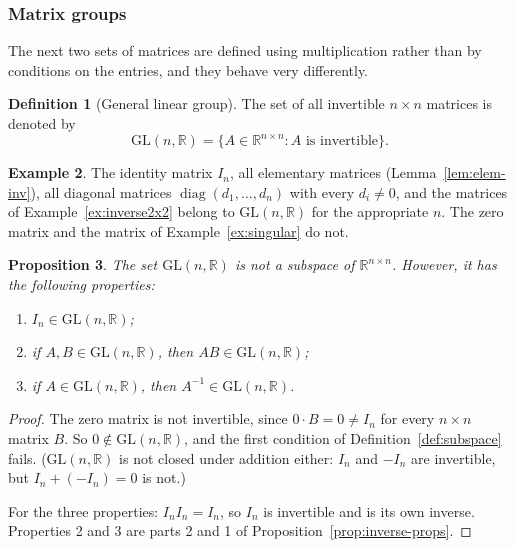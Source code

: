 \documentclass[11pt]{article}
\theoremstyle{definition}
\newtheorem{definition}{Definition}[section]
\newtheorem{example}[definition]{Example}
\theoremstyle{plain}
\newtheorem{proposition}[definition]{Proposition}
\theoremstyle{remark}
\DeclareMathOperator{\diag}{diag}
\begin{document}
\subsubsection{Matrix groups}

The next two sets of matrices are defined using multiplication rather than by conditions on the entries, and they behave very differently.

\begin{definition}[General linear group]
    The set of all invertible $n \times n$ matrices is denoted by
    \[\mathrm{GL}(n, \mathbb{R}) = \{A \in \mathbb{R}^{n \times n} : A \text{ is invertible}\}.\]
\end{definition}

\begin{example}
    The identity matrix $I_n$, all elementary matrices (Lemma~\ref{lem:elem-inv}), all diagonal matrices $\diag(d_1, \ldots, d_n)$ with every $d_i \neq 0$, and the matrices of Example~\ref{ex:inverse2x2} belong to $\mathrm{GL}(n, \mathbb{R})$ for the appropriate $n$. The zero matrix and the matrix of Example~\ref{ex:singular} do not.
\end{example}

\begin{proposition}\label{prop:GL}
    The set $\mathrm{GL}(n, \mathbb{R})$ is not a subspace of $\mathbb{R}^{n \times n}$. However, it has the following properties:
    \begin{enumerate}
        \item $I_n \in \mathrm{GL}(n, \mathbb{R})$;
        \item if $A, B \in \mathrm{GL}(n, \mathbb{R})$, then $AB \in \mathrm{GL}(n, \mathbb{R})$;
        \item if $A \in \mathrm{GL}(n, \mathbb{R})$, then $A^{-1} \in \mathrm{GL}(n, \mathbb{R})$.
    \end{enumerate}
\end{proposition}

\begin{proof}
    The zero matrix is not invertible, since $0 \cdot B = 0 \neq I_n$ for every $n \times n$ matrix $B$. So $0 \notin \mathrm{GL}(n, \mathbb{R})$, and the first condition of Definition~\ref{def:subspace} fails. ($\mathrm{GL}(n, \mathbb{R})$ is not closed under addition either: $I_n$ and $-I_n$ are invertible, but $I_n + (-I_n) = 0$ is not.)

    For the three properties: $I_n I_n = I_n$, so $I_n$ is invertible and is its own inverse. Properties 2 and 3 are parts 2 and 1 of Proposition~\ref{prop:inverse-props}.
\end{proof}
\end{document}
